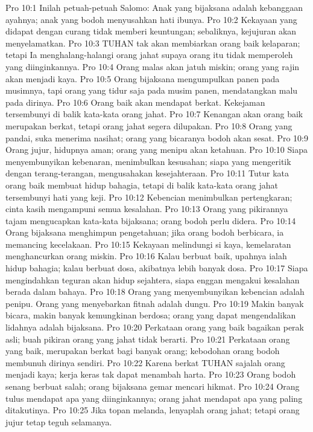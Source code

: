 Pro 10:1  Inilah petuah-petuah Salomo: Anak yang bijaksana adalah kebanggaan ayahnya; anak yang bodoh menyusahkan hati ibunya.
Pro 10:2  Kekayaan yang didapat dengan curang tidak memberi keuntungan; sebaliknya, kejujuran akan menyelamatkan.
Pro 10:3  TUHAN tak akan membiarkan orang baik kelaparan; tetapi Ia menghalang-halangi orang jahat supaya orang itu tidak memperoleh yang diinginkannya.
Pro 10:4  Orang malas akan jatuh miskin; orang yang rajin akan menjadi kaya.
Pro 10:5  Orang bijaksana mengumpulkan panen pada musimnya, tapi orang yang tidur saja pada musim panen, mendatangkan malu pada dirinya.
Pro 10:6  Orang baik akan mendapat berkat. Kekejaman tersembunyi di balik kata-kata orang jahat.
Pro 10:7  Kenangan akan orang baik merupakan berkat, tetapi orang jahat segera dilupakan.
Pro 10:8  Orang yang pandai, suka menerima nasihat; orang yang bicaranya bodoh akan sesat.
Pro 10:9  Orang jujur, hidupnya aman; orang yang menipu akan ketahuan.
Pro 10:10  Siapa menyembunyikan kebenaran, menimbulkan kesusahan; siapa yang mengeritik dengan terang-terangan, mengusahakan kesejahteraan.
Pro 10:11  Tutur kata orang baik membuat hidup bahagia, tetapi di balik kata-kata orang jahat tersembunyi hati yang keji.
Pro 10:12  Kebencian menimbulkan pertengkaran; cinta kasih mengampuni semua kesalahan.
Pro 10:13  Orang yang pikirannya tajam mengucapkan kata-kata bijaksana; orang bodoh perlu didera.
Pro 10:14  Orang bijaksana menghimpun pengetahuan; jika orang bodoh berbicara, ia memancing kecelakaan.
Pro 10:15  Kekayaan melindungi si kaya, kemelaratan menghancurkan orang miskin.
Pro 10:16  Kalau berbuat baik, upahnya ialah hidup bahagia; kalau berbuat dosa, akibatnya lebih banyak dosa.
Pro 10:17  Siapa mengindahkan teguran akan hidup sejahtera, siapa enggan mengakui kesalahan berada dalam bahaya.
Pro 10:18  Orang yang menyembunyikan kebencian adalah penipu. Orang yang menyebarkan fitnah adalah dungu.
Pro 10:19  Makin banyak bicara, makin banyak kemungkinan berdosa; orang yang dapat mengendalikan lidahnya adalah bijaksana.
Pro 10:20  Perkataan orang yang baik bagaikan perak asli; buah pikiran orang yang jahat tidak berarti.
Pro 10:21  Perkataan orang yang baik, merupakan berkat bagi banyak orang; kebodohan orang bodoh membunuh dirinya sendiri.
Pro 10:22  Karena berkat TUHAN sajalah orang menjadi kaya; kerja keras tak dapat menambah harta.
Pro 10:23  Orang bodoh senang berbuat salah; orang bijaksana gemar mencari hikmat.
Pro 10:24  Orang tulus mendapat apa yang diinginkannya; orang jahat mendapat apa yang paling ditakutinya.
Pro 10:25  Jika topan melanda, lenyaplah orang jahat; tetapi orang jujur tetap teguh selamanya.

